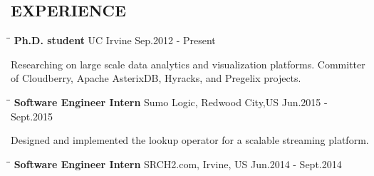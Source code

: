 \documentclass{res}
\begin{document}

\address{jianfeng.jia@gmail.com (949)678-9893}

\begin{resume}

\section{EXPERIENCE}
   \vspace{-0.1in}
   \begin{tabbing}
   \hspace{2in}\= \hspace{3in}\= \kill %
    {\bf Ph.D. student} \>UC Irvine  \>Sep.2012 - Present\\
   \end{tabbing}\vspace{-30pt}      %
   Researching on large scale data analytics and visualization platforms. Committer of Cloudberry, Apache AsterixDB, Hyracks, and Pregelix projects.
   \vspace{-0.1in}
   \begin{tabbing}
   \hspace{2in}\= \hspace{3in}\= \kill %
    {\bf Software Engineer Intern} \>Sumo Logic, Redwood City,US \>Jun.2015 - Sept.2015\\
   \end{tabbing}\vspace{-30pt}      %
   Designed and implemented the lookup operator for a scalable streaming platform.
   \vspace{-0.1in}
   \begin{tabbing}
   \hspace{2in}\= \hspace{3in}\= \kill %
    {\bf Software Engineer Intern} \>SRCH2.com, Irvine, US     \>Jun.2014 - Sept.2014\\
   \end{tabbing}\vspace{-30pt}      %

\end{resume}
\end{document}
